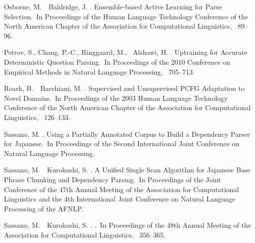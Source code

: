 \documentclass[english]{jnlp_1.4}
\begin{document}
\begin{thebibliography}{}
Osborne, M.\BBACOMMA\ \BBA\ Baldridge, J. \BBCP.
\newblock \BBOQ Ensemble-based Active Learning for Parse Selection.\BBCQ\
\newblock In {\Bem Proceedings of the Human Language Technology Conference of
  the North American Chapter of the Association for Computational Linguistics},
  \mbox{\BPGS\ 89--96}.

Petrov, S., Chang, P.-C., Ringgaard, M., \BBA\ Alshawi, H. \BBOP 2010\BBCP.
\newblock \BBOQ Uptraining for Accurate Deterministic Question Parsing.\BBCQ\
\newblock In {\Bem Proceedings of the 2010 Conference on Empirical Methods in
  Natural Language Processing}, \mbox{\BPGS\ 705--713}.

Roark, B.\BBACOMMA\ \BBA\ Bacchiani, M. \BBOP 2003\BBCP.
\newblock \BBOQ Supervised and Unsupervised {PCFG} Adaptation to Novel
  Domains.\BBCQ\
\newblock In {\Bem Proceedings of the 2003 Human Language Technology Conference
  of the North American Chapter of the Association for Computational
  Linguistics}, \mbox{\BPGS\ 126--133}.

Sassano, M. \BBOP 2005\BBCP.
\newblock \BBOQ Using a Partially Annotated Corpus to Build a Dependency Parser
  for {J}apanese.\BBCQ\
\newblock In {\Bem Proceedings of the Second International Joint Conference on
  Natural Language Processing}.

Sassano, M.\BBACOMMA\ \BBA\ Kurohashi, S. \BBOP 2009\BBCP.
\newblock \BBOQ A Unified Single Scan Algorithm for {J}apanese Base Phrase
  Chunking and Dependency Parsing.\BBCQ\
\newblock In {\Bem Proceedings of the Joint Conference of the 47th Annual
  Meeting of the Association for Computational Linguistics and the 4th
  International Joint Conference on Natural Language Processing of the AFNLP}.

Sassano, M.\BBACOMMA\ \BBA\ Kurohashi, S. \BBOP 2010\BBCP.
\newblock {}.\BBCQ\
\newblock In {\Bem Proceedings of the 48th Annual Meeting of the Association
  for Computational Linguistics}, \mbox{\BPGS\ 356--365}.


\end{thebibliography}
\end{document}
